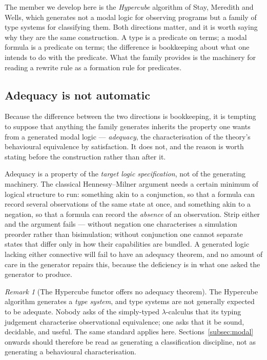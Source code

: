 \documentclass[11pt]{article}
\theoremstyle{definition}
\theoremstyle{plain}
\theoremstyle{remark}
\newtheorem{remark}[definition]{Remark}
\begin{document}
The member we develop here is the \emph{Hypercube} algorithm of Stay, Meredith and
Wells, which generates not a modal logic for observing programs but a family of type
systems for classifying them. Both directions matter, and it is worth saying why they are
the same construction. A type is a predicate on terms; a modal formula is a predicate on
terms; the difference is bookkeeping about what one intends to do with the predicate. What
the family provides is the machinery for reading a rewrite rule as a formation rule for
predicates.

\subsection{Adequacy is not automatic}
\label{subsec:adequacy}

Because the difference between the two directions is bookkeeping, it is tempting to
suppose that anything the family generates inherits the property one wants from a
generated modal logic --- \emph{adequacy}, the characterisation of the theory's
behavioural equivalence by satisfaction. It does not, and the reason is worth stating
before the construction rather than after it.

Adequacy is a property of the \emph{target logic specification}, not of the generating
machinery. The classical Hennessy--Milner argument needs a certain minimum of logical
structure to run: something akin to a conjunction, so that a formula can record several
observations of the same state at once, and something akin to a negation, so that a
formula can record the \emph{absence} of an observation. Strip either and the argument
fails --- without negation one characterises a simulation preorder rather than
bisimulation; without conjunction one cannot separate states that differ only in how
their capabilities are bundled. A generated logic lacking either connective will fail to
have an adequacy theorem, and no amount of care in the generator repairs this, because
the deficiency is in what one asked the generator to produce.

\begin{remark}[The Hypercube functor offers no adequacy theorem]
\label{rem:no-adequacy}
The Hypercube algorithm generates a \emph{type system}, and type systems are not
generally expected to be adequate. Nobody asks of the simply-typed $\lambda$-calculus
that its typing judgement characterise observational equivalence; one asks that it be
sound, decidable, and useful. The same standard applies here. Sections~\ref{subsec:modal}
onwards should therefore be read as generating a classification discipline, not as
generating a behavioural characterisation.
\end{remark}
\end{document}
